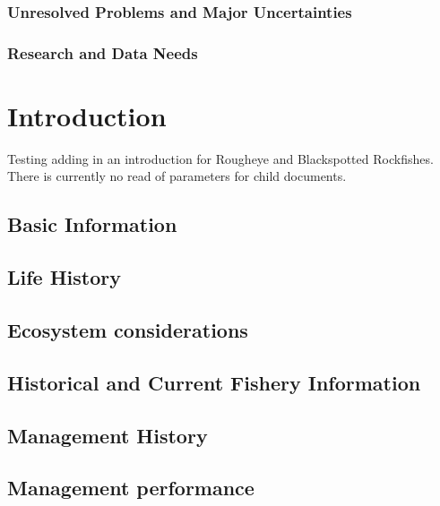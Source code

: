 \documentclass[
]{scrartcl}
\begin{document}
\subsubsection{Unresolved Problems and Major
Uncertainties}\label{unresolved-problems-and-major-uncertainties}

\subsubsection{Research and Data Needs}\label{research-and-data-needs}

\newpage{}

\section{Introduction}\label{introduction}

Testing adding in an introduction for Rougheye and Blackspotted
Rockfishes. There is currently no read of parameters for child
documents.

\subsection{Basic Information}\label{basic-information}

\subsection{Life History}\label{life-history}

\subsection{Ecosystem considerations}\label{ecosystem-considerations}

\subsection{Historical and Current Fishery
Information}\label{historical-and-current-fishery-information}

\subsection{Management History}\label{management-history}

\subsection{Management performance}\label{management-performance-1}
\end{document}
